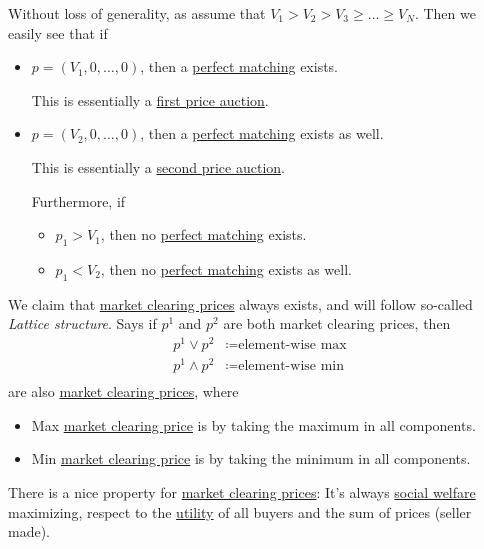 Without loss of generality, as assume that \(V_{1}>V_{2}>V_{3}\geq \ldots \geq V_{N}\). Then we easily see that if
\begin{itemize}
	\item \(p = (V_{1}, 0, \ldots , 0 )\), then a \hyperref[def:perfect-matching]{perfect matching} exists.
	      \begin{note}
		      This is essentially a \hyperref[eg:first-price-auction]{first price auction}.
	      \end{note}
	\item \(p = (V_{2}, 0, \ldots , 0 )\), then a \hyperref[def:perfect-matching]{perfect matching} exists as well.
	      \begin{note}
		      This is essentially a \hyperref[eg:second-price-auction]{second price auction}.
	      \end{note}
	      Furthermore, if
	      \begin{itemize}
		      \item \(p_{1}>V_{1}\), then no \hyperref[def:perfect-matching]{perfect matching} exists.
		      \item \(p_{1}<V_{2}\), then no \hyperref[def:perfect-matching]{perfect matching} exists as well.
	      \end{itemize}
\end{itemize}

We claim that \hyperref[note:market-clearing-prices]{market clearing prices} always exists, and will follow so-called \emph{Lattice structure}. Says if \(p^{1}\) and \(p^{2}\) are both market clearing prices, then
\[
	\begin{split}
		p^{1}\lor p^{2} &\coloneqq \text{element-wise max}\\
		p^{1}\land p^{2} &\coloneqq \text{element-wise min}\\
	\end{split}
\]
are also \hyperref[note:market-clearing-prices]{market clearing prices}, where
\begin{itemize}
	\item Max \hyperref[note:market-clearing-prices]{market clearing price} is by taking the maximum in all components.
	\item Min \hyperref[note:market-clearing-prices]{market clearing price} is by taking the minimum in all components.
\end{itemize}

\begin{remark}
	There is a nice property for \hyperref[note:market-clearing-prices]{market clearing prices}: It's always \hyperref[def:social-welfare]{social welfare}
	maximizing, respect to the \hyperref[def:reward]{utility} of all buyers and the sum of prices (seller made).
\end{remark}

